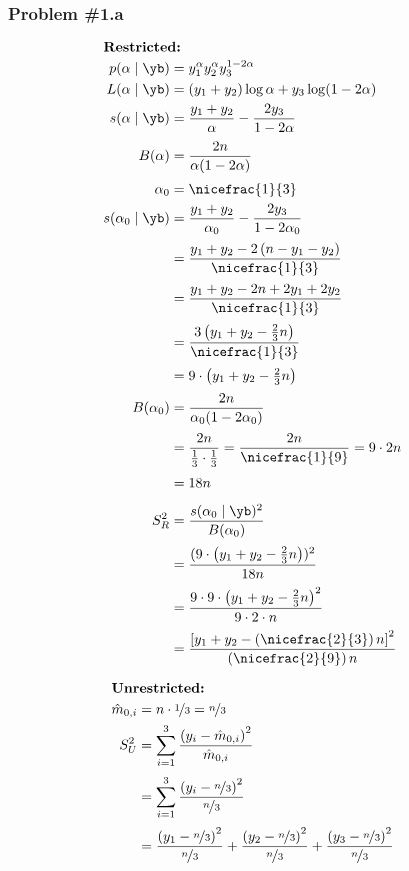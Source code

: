 \documentclass[12pt, letterpaper]{article}
\begin{document}
\subsubsection*{Problem {\#}1.a}  
\begin{multicols}{2}
\begin{align*}
\omit\rlap{\textbf{Restricted:}} \\
p(\alpha \mid \yb) & = y_1^\alpha y_2^\alpha y_3^{1 - 2 \alpha} 
\\
L(\alpha \mid \yb) & = (y_1 + y_2) \log \alpha + y_3 \log (1 - 2 \alpha)
\\
s(\alpha \mid \yb) & = \frac{ y_1 + y_2}{\alpha} - \frac{2 y_3}{1 - 2\alpha }
\\[0.5ex]
B(\alpha ) & = \frac{ 2n}{\alpha(1 - 2 \alpha)} 
\\[0.5ex]
\alpha_0 & = \nicefrac{1}{3} 
\\
s(\alpha_0 \mid \yb) & = \frac{y_1 + y_2}{\alpha_0} - \frac{2 y_3}{1 - 2 \alpha_0} 
\\[0.5ex]
&= \frac{ y_1 + y_2 - 2\left(n - y_1 - y_2\right)}{\nicefrac{1}{3}} 
\\[0.5ex]
& = \frac{ y_1 + y_2 - 2n + 2y_1 + 2y_2}{\nicefrac{1}{3}} 
\\[0.5ex]
& = \frac{ 3\left( y_1 + y_2 - \frac{2}{3}n\right)}{ \nicefrac{1}{3}}
\\[0.5ex]
& = 9 \cdot \left(y_1 + y_2 - \tfrac{2}{3} n\right)
\\[0.5ex]
B(\alpha_0) & = \frac{2n}{\alpha_0 (1 - 2 \alpha_0)} 
\\[0.5ex]
& = \frac{ 2 n}{ \frac{1}{3} \cdot \frac{1}{3} } = \frac{2n}{\nicefrac{1}{9}} = 9 \cdot 2n 
\\[0.5ex]
& = 18 n 
\\[1ex]
S^2_R & = \frac{s(\alpha_0 \mid \yb)^2 }{B(\alpha_0)} 
\\[0.5ex]
&= \frac{( 9 \cdot \left(y_1 + y_2 - \frac{2}{3} n\right))^2  }{18 n  } 
\\[0.5ex]
& =  \frac{ 9 \cdot 9 \cdot \left(y_1 + y_2 - \tfrac{2}{3} n\right)^2 }{ 9 \cdot 2 \cdot n }
\\[0.5ex]
& = \frac{ \left[ y_1 + y_2 - \left( \nicefrac{2}{3} \right) n \right]^2 }{ \left( \nicefrac{2}{9} \right)n} 
\end{align*}

\columnbreak 
\begin{align*}
\omit\rlap{\textbf{Unrestricted:}} \\
\hat{m}_{0, i} & = n \cdot \nicefrac{1}{3} = \nicefrac{n}{3} 
\\
S^2_U & = \sum_{i=1}^3 \frac{ \left( y_i - \hat{m}_{0, i} \right)^2}{\hat{m}_{0, i} }
\\[0.5ex]
& = \sum_{i=1}^3 \frac{ \left( y_i - \nicefrac{n}{3} \right)^2}{\nicefrac{n}{3}  }
\\[0.5ex]
& = 
\frac{ \left( y_1 - \nicefrac{n}{3} \right)^2}{\nicefrac{n}{3}  }
+
\frac{ \left( y_2 - \nicefrac{n}{3} \right)^2}{\nicefrac{n}{3}  }
+
\frac{ \left( y_3 - \nicefrac{n}{3} \right)^2}{\nicefrac{n}{3}  }
\end{align*}

\end{multicols}
\end{document}
